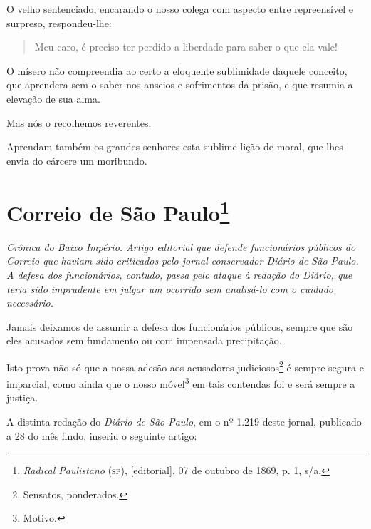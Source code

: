 O velho sentenciado, encarando o nosso colega com aspecto entre
repreensível e surpreso, respondeu-lhe:

\begin{quote}
Meu caro, é preciso ter perdido a liberdade para saber o que ela vale!
\end{quote}

O mísero não compreendia ao certo a eloquente sublimidade daquele
conceito, que aprendera sem o saber nos anseios e sofrimentos da prisão,
e que resumia a elevação de sua alma.

Mas nós o recolhemos reverentes.

\noindent\dotfill

Aprendam também os grandes senhores esta sublime lição de moral, que
lhes envia do cárcere um moribundo.

\chapter{Correio de São Paulo\footnote{\emph{Radical Paulistano} (\textsc{sp}),
  {[}editorial{]}, 07 de outubro de 1869, p. 1, s/a.}}

\begin{didascalia}\itshape
Crônica do Baixo Império. Artigo editorial que defende funcionários
públicos do Correio que haviam sido criticados pelo jornal
conservador \textnormal{Diário de São Paulo}. A defesa dos funcionários,
contudo, passa pelo ataque à redação do \textnormal{Diário}, que teria sido
imprudente em julgar um ocorrido sem analisá-lo com o cuidado
necessário.
\end{didascalia}



Jamais deixamos de assumir a defesa dos funcionários públicos, sempre
que são eles acusados sem fundamento ou com impensada precipitação.

Isto prova não só que a nossa adesão aos acusadores
judiciosos\footnote{Sensatos, ponderados.} é sempre segura e
imparcial, como ainda que o nosso móvel\footnote{Motivo.} em tais
contendas foi e será sempre a justiça.

A distinta redação do \emph{Diário de São Paulo}, em o nº 1.219 deste
jornal, publicado a 28 do mês findo, inseriu o seguinte artigo:

